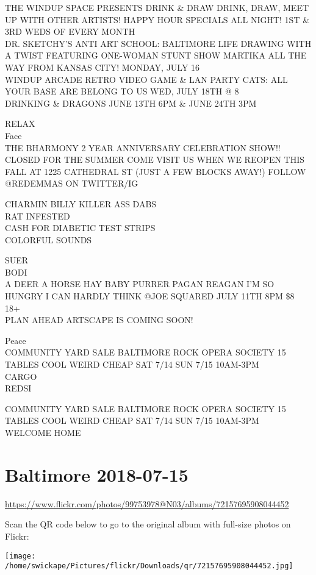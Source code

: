 \documentclass[10pt,letterpaper]{article}
\begin{document}
THE WINDUP SPACE PRESENTS DRINK \& DRAW DRINK, DRAW, MEET UP WITH OTHER ARTISTS!  HAPPY HOUR SPECIALS ALL NIGHT!  1ST \& 3RD WEDS OF EVERY MONTH\\
DR. SKETCHY'S ANTI ART SCHOOL: BALTIMORE LIFE DRAWING WITH A TWIST FEATURING ONE{-}WOMAN STUNT SHOW MARTIKA ALL THE WAY FROM KANSAS CITY! MONDAY, JULY 16\\
WINDUP ARCADE RETRO VIDEO GAME \& LAN PARTY CATS: ALL YOUR BASE ARE BELONG TO US WED, JULY 18TH @ 8\\
DRINKING \& DRAGONS JUNE 13TH 6PM \& JUNE 24TH 3PM

RELAX\\
Face\\
THE BHARMONY 2 YEAR ANNIVERSARY CELEBRATION SHOW!!\\
CLOSED FOR THE SUMMER COME VISIT US WHEN WE REOPEN THIS FALL AT 1225 CATHEDRAL ST (JUST A FEW BLOCKS AWAY!) FOLLOW @REDEMMAS ON TWITTER/IG

CHARMIN BILLY KILLER ASS DABS\\
RAT INFESTED\\
CASH FOR DIABETIC TEST STRIPS\\
COLORFUL SOUNDS

SUER\\
BODI\\
A DEER A HORSE HAY BABY PURRER PAGAN REAGAN I'M SO HUNGRY I CAN HARDLY THINK @JOE SQUARED JULY 11TH 8PM \$8 18+\\
PLAN AHEAD ARTSCAPE IS COMING SOON!

Peace\\
COMMUNITY YARD SALE BALTIMORE ROCK OPERA SOCIETY 15 TABLES COOL WEIRD CHEAP SAT 7/14 SUN 7/15 10AM{-}3PM\\
CARGO\\
REDSI

COMMUNITY YARD SALE BALTIMORE ROCK OPERA SOCIETY 15 TABLES COOL WEIRD CHEAP SAT 7/14 SUN 7/15 10AM{-}3PM\\
WELCOME HOME


\section*{Baltimore 2018-07-15}

\url{https://www.flickr.com/photos/99753978@N03/albums/72157695908044452}

Scan the QR code below to go to the original album with full-size photos on Flickr:

\texttt{[image: /home/swickape/Pictures/flickr/Downloads/qr/72157695908044452.jpg]}
\end{document}
